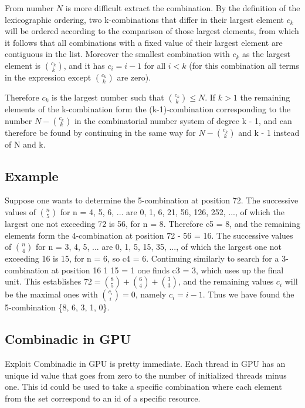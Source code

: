 From number $N$ is more difficult extract the combination. By the definition of the lexicographic ordering, two k-combinations that 
differ in their largest element $c_k$ will be ordered according to the comparison of those largest elements, from which it follows that all
combinations with a fixed value of their largest element are contiguous in the list. Moreover the smallest combination with $c_k$ as
the largest element is $\binom {c_{k}}{k}$, and it has $c_i = i - 1$ for all $i < k$ (for this combination all terms 
in the expression except $\binom {c_{k}}{k}$ are zero). 

Therefore $c_k$ is the largest number such that $\binom {c_{k}}{k} \leq N$. 
If $k > 1$ the remaining elements of the k-combination form the (k-1)-combination corresponding to the number
$N - \binom {c_{k}}{k}$ in the combinatorial number system of degree k - 1, and can therefore be found 
by continuing in the same way for $N - \binom {c_{k}}{k}$ and k - 1 instead of N and k.

\subsection{Example}

Suppose one wants to determine the 5-combination at position 72.
The successive values of $\binom {n}{5}$ for n = 4, 5, 6, ... are 0, 1, 6, 21, 56, 126, 252, ..., of which the largest 
one not exceeding 72 is 56, for n = 8. Therefore c5 = 8, and the remaining elements form the 4-combination at position 
72 - 56 = 16. The successive values of $\binom {n}{4}$ for n = 3, 4, 5, ... are 0, 1, 5, 15, 35, ..., of which the largest
one not exceeding 16 is 15, for n = 6, so c4 = 6. Continuing similarly to search for a 3-combination at position 16 1 15 = 1
one finds c3 = 3, which uses up the final unit.
This establishes $72=\binom{8}{5}+\binom{6}{4}+\binom {3}{3}$, and the remaining values $c_i$ will be the maximal ones with
$\binom{c_i}{i}=0$, namely $c_i = i - 1$. Thus we have found the 5-combination \{8, 6, 3, 1, 0\}.

\subsection{Combinadic in GPU}

Exploit Combinadic in GPU is pretty immediate. Each thread in GPU has an unique id value that goes from zero to the number of initialized threads minus one. 
This id could be used to take a specific combination where each element from the set correspond to an id of a specific resource. 


